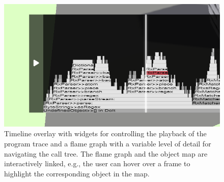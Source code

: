\begin{figure}
	\includegraphics[width=\linewidth]{sections/03_visualization_approach/mapping/timeline}
	\caption{
		Timeline overlay with widgets for controlling the playback of the program trace and a flame graph with a variable level of detail for navigating the call tree.
		The flame graph and the object map are interactively linked, e.g., the user can hover over a frame to highlight the corresponding object in the map.
	}
	\label{fig:visualization_approach/mapping/timeline}
\end{figure}
